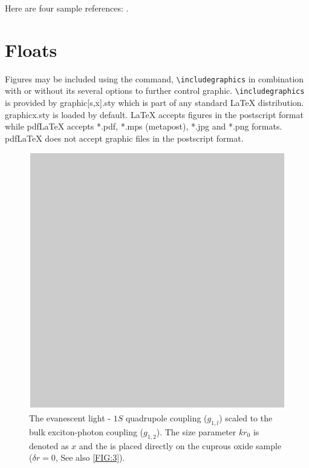 \documentclass[a4paper,fleqn]{cas-dc}
\begin{document}
Here are four sample references: 
\cite{Fortunato2010}
\cite{Fortunato2010,NewmanGirvan2004} 	
\cite{Fortunato2010,Vehlowetal2013} 	
\cite{Fortunato2010,NewmanGirvan2004,Vehlowetal2013,Chenetal2013,Clausetetal2004,FabricioLiang2013,Gregory2011,FortunatoBarthelemy2007,HullermeierRifqi2009,Nepuszetal2008,Newman2013}. 					

\section{Floats}
{Figures} may be included using the command,\linebreak 
\verb+\includegraphics+ in
combination with or without its several options to further control
graphic. \verb+\includegraphics+ is provided by {graphic[s,x].sty}
which is part of any standard \LaTeX{} distribution. 
{graphicx.sty} is loaded by default. \LaTeX{} accepts figures in
the \linebreak postscript format while pdf\LaTeX{} accepts {*.pdf},
{*.mps} (metapost), {*.jpg} and {*.png} formats. 
pdf\LaTeX{} does not accept graphic files in the postscript format. 

\begin{figure}
	\centering
	\includegraphics[scale=1]{figs/Fig1.pdf}
	\caption{The evanescent light - $1S$ quadrupole coupling
	($g_{1,l}$) scaled to the bulk exciton-photon coupling
	($g_{1,2}$). The size parameter $kr_{0}$ is denoted as $x$ and
	the \PMS is placed directly on the cuprous oxide sample ($\delta
	r=0$, See also \protect\ref{FIG:3}).}
	\label{FIG:4}
\end{figure}
\end{document}
